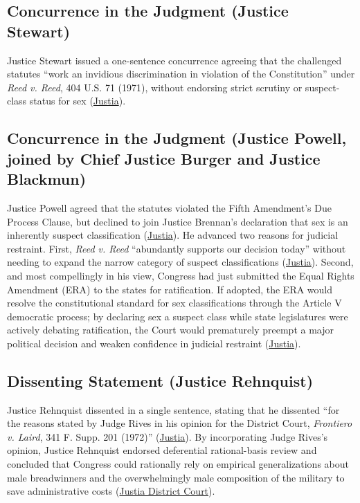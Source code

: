 \documentclass[12pt]{article}
\begin{document}
\subsection{Concurrence in the Judgment (Justice Stewart)}
Justice Stewart issued a one-sentence concurrence agreeing that the challenged statutes ``work an invidious discrimination in violation of the Constitution'' under \textit{Reed v. Reed}, 404 U.S. 71 (1971), without endorsing strict scrutiny or suspect-class status for sex (\href{https://supreme.justia.com/cases/federal/us/411/677/}{Justia}).

\subsection{Concurrence in the Judgment (Justice Powell, joined by Chief Justice Burger and Justice Blackmun)}
Justice Powell agreed that the statutes violated the Fifth Amendment's Due Process Clause, but declined to join Justice Brennan's declaration that sex is an inherently suspect classification (\href{https://supreme.justia.com/cases/federal/us/411/677/}{Justia}). He advanced two reasons for judicial restraint. First, \textit{Reed v. Reed} ``abundantly supports our decision today'' without needing to expand the narrow category of suspect classifications (\href{https://supreme.justia.com/cases/federal/us/411/677/}{Justia}). Second, and most compellingly in his view, Congress had just submitted the Equal Rights Amendment (ERA) to the states for ratification. If adopted, the ERA would resolve the constitutional standard for sex classifications through the Article V democratic process; by declaring sex a suspect class while state legislatures were actively debating ratification, the Court would prematurely preempt a major political decision and weaken confidence in judicial restraint (\href{https://supreme.justia.com/cases/federal/us/411/677/}{Justia}).

\subsection{Dissenting Statement (Justice Rehnquist)}
Justice Rehnquist dissented in a single sentence, stating that he dissented ``for the reasons stated by Judge Rives in his opinion for the District Court, \textit{Frontiero v. Laird}, 341 F. Supp. 201 (1972)'' (\href{https://supreme.justia.com/cases/federal/us/411/677/}{Justia}). By incorporating Judge Rives's opinion, Justice Rehnquist endorsed deferential rational-basis review and concluded that Congress could rationally rely on empirical generalizations about male breadwinners and the overwhelmingly male composition of the military to save administrative costs (\href{https://law.justia.com/cases/federal/district-courts/FSupp/341/201/1456940/}{Justia District Court}).
\end{document}
